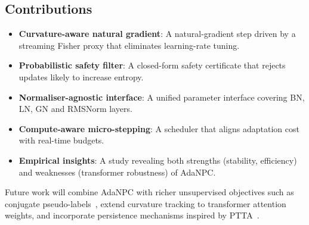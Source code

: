 \documentclass{article} %
\begin{document}
\subsection{Contributions}
\begin{itemize}
  \item \textbf{Curvature-aware natural gradient}: A natural-gradient step driven by a streaming Fisher proxy that eliminates learning-rate tuning.
  \item \textbf{Probabilistic safety filter}: A closed-form safety certificate that rejects updates likely to increase entropy.
  \item \textbf{Normaliser-agnostic interface}: A unified parameter interface covering BN, LN, GN and RMSNorm layers.
  \item \textbf{Compute-aware micro-stepping}: A scheduler that aligns adaptation cost with real-time budgets.
  \item \textbf{Empirical insights}: A study revealing both strengths (stability, efficiency) and weaknesses (transformer robustness) of AdaNPC\@.
\end{itemize}
Future work will combine AdaNPC with richer unsupervised objectives such as conjugate pseudo-labels~\cite{goyal-2022-test}, extend curvature tracking to transformer attention weights, and incorporate persistence mechanisms inspired by PTTA~\cite{yuan-2023-robust,hoang-2023-persistent}.
\end{document}
